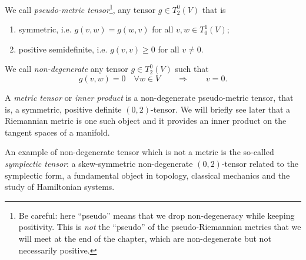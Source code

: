 \begin{definition}\label{def:metric}
	We call \emph{pseudo-metric tensor}\footnote{Be careful: here ``pseudo'' means that we drop non-degeneracy while keeping positivity. This is \emph{not} the ``pseudo'' of the pseudo-Riemannian metrics that we will meet at the end of the chapter, which are non-degenerate but not necessarily positive.}, any tensor $g\in T_2^0(V)$ that is
	\begin{enumerate}
		\item symmetric, i.e. $g(v,w) = g(w,v)$ for all $v,w\in T_0^1(V)$;
		\item positive semidefinite, i.e. $g(v,v)\geq0$ for all $v\neq 0$.
	\end{enumerate}

	We call \emph{non-degenerate} any tensor $g\in T_2^0(V)$ such that
	\begin{equation}
		g(v,w) = 0 \quad\forall w\in V \qquad\Longrightarrow\qquad v=0.
	\end{equation}

	A \emph{metric tensor} or \emph{inner product} is a non-degenerate pseudo-metric tensor, that is, a symmetric, positive definite $(0,2)$-tensor.
	We will briefly see later that a Riemannian metric is one such object and it provides an inner product on the tangent spaces of a manifold.

	An example of non-degenerate tensor which is not a metric is the so-called \emph{symplectic tensor}: a skew-symmetric non-degenerate $(0,2)$-tensor related to the symplectic form, a fundamental object in topology, classical mechanics and the study of Hamiltonian systems.
\end{definition}

